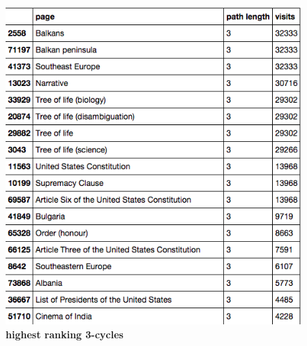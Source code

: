 \documentclass[pre,twocolumn,twoside,superscriptaddress,floatfix, aps, 10pt]{revtex4-1}
\begin{document}
\begin{figure}[tp!]
  \centering	
  \includegraphics[width=\columnwidth]{graphics/top_3loops.png}
  \caption{
    \textbf{highest ranking 3-cycles}
  }
  \label{fig:Highest Ranking 3-cyles}
\end{figure}
\end{document}
